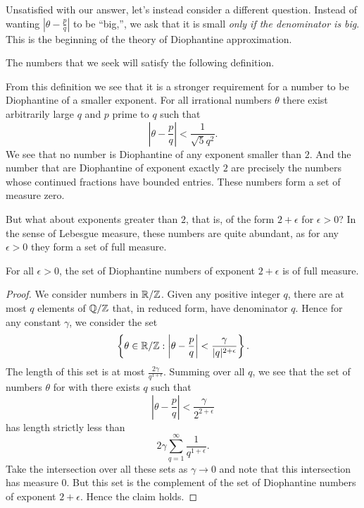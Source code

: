 \documentclass[twoside,letterpaper,10pt]{article}
\begin{document}
Unsatisfied with our answer, let's instead consider a different question.
Instead of wanting $\left| \theta - \frac{p}{q} \right|$ to be ``big,'', we ask
that it is small \emph{only if the denominator is big}.
This is the beginning of the theory of Diophantine approximation.

The numbers that we seek will satisfy the following definition.
\begin{defn}
  \dionumber{}
\end{defn}
From this definition we see that it is a stronger requirement for a number to be
Diophantine of a smaller exponent.
For all irrational numbers $\theta$ there exist arbitrarily large $q$ and $p$
prime to $q$ such that
\begin{equation*}
  \left| \theta - \frac{p}{q} \right| < \frac{1}{\sqrt{5}q^2}.
\end{equation*}
We see that no number is Diophantine of any exponent smaller than $2$.
And the number that are Diophantine of exponent exactly $2$ are precisely the
numbers whose continued fractions have bounded entries.
These numbers form a set of measure zero.

But what about exponents greater than $2$, that is, of the form $2 + \epsilon$
for $\epsilon > 0$?
In the sense of Lebesgue measure, these numbers are quite abundant, as for any
$\epsilon > 0$ they form a set of full measure.
\begin{prop}
  \label{prop:dio-num-with-full-meas}
  For all $\epsilon > 0$, the set of Diophantine numbers of exponent $2 +
  \epsilon$ is of full measure.
\end{prop}
\begin{proof}
  We consider numbers in $\mathbb{R} / \mathbb{Z}$.
  Given any positive integer $q$, there are at most $q$ elements of $\mathbb{Q} / \mathbb{Z}$
  that, in reduced form, have denominator $q$.
  Hence for any constant $\gamma$, we consider the set
  \begin{equation*}
    \left\{ \theta \in \mathbb{R} / \mathbb{Z} : \left| \theta - \frac{p}{q} \right| <
      \frac{\gamma}{|q|^{2 + \epsilon}} \right\}.
  \end{equation*}
  The length of this set is at most $\frac{2\gamma}{q^{1 + \epsilon}}$.
  Summing over all $q$, we see that the set of numbers $\theta$ for with there
  exists $q$ such that
  \begin{equation*}
    \left| \theta - \frac{p}{q} \right| < \frac{\gamma}{2^{2 + \epsilon}}
  \end{equation*}
  has length strictly less than
  \begin{equation*}
    2 \gamma \sum_{q = 1}^{\infty} \frac{1}{q^{1 + \epsilon}}.
  \end{equation*}
  Take the intersection over all these sets as $\gamma \to 0$ and note that this
  intersection has measure $0$.
  But this set is the complement of the set of Diophantine numbers of exponent
  $2 + \epsilon$.
  Hence the claim holds.
\end{proof}
\end{document}
